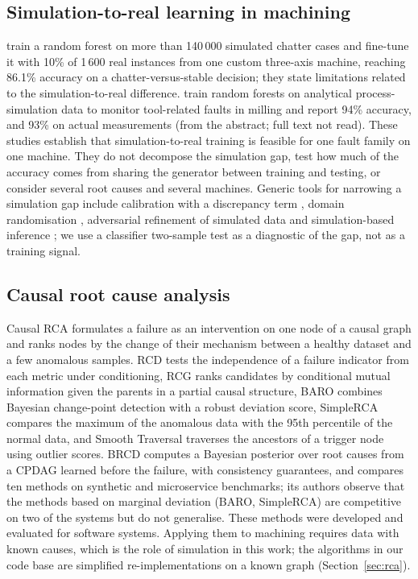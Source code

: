 \documentclass[11pt]{article}
\begin{document}
\subsection{Simulation-to-real learning in machining}
\citet{alberts2024sim2real} train a random forest on more than 140\,000 simulated chatter cases and fine-tune it with 10\% of 1\,600 real instances from one custom three-axis machine, reaching 86.1\% accuracy on a chatter-versus-stable decision; they state limitations related to the simulation-to-real difference.
\citet{ebrahimi2023smartfaults} train random forests on analytical process-simulation data to monitor tool-related faults in milling and report 94\% accuracy, and 93\% on actual measurements (from the abstract; full text not read).
These studies establish that simulation-to-real training is feasible for one fault family on one machine.
They do not decompose the simulation gap, test how much of the accuracy comes from sharing the generator between training and testing, or consider several root causes and several machines.
Generic tools for narrowing a simulation gap include calibration with a discrepancy term \citep{kennedy2001}, domain randomisation \citep{tobin2017}, adversarial refinement of simulated data \citep{shrivastava2017} and simulation-based inference \citep{cranmer2020}; we use a classifier two-sample test \citep{lopezpaz2017c2st} as a diagnostic of the gap, not as a training signal.

\subsection{Causal root cause analysis}
Causal RCA formulates a failure as an intervention on one node of a causal graph and ranks nodes by the change of their mechanism between a healthy dataset and a few anomalous samples.
RCD \citep{ikram2022rcd} tests the independence of a failure indicator from each metric under conditioning, RCG \citep{ikram2025rcg} ranks candidates by conditional mutual information given the parents in a partial causal structure, BARO \citep{pham2024baro} combines Bayesian change-point detection with a robust deviation score, SimpleRCA \citep{fang2025simplerca} compares the maximum of the anomalous data with the 95th percentile of the normal data, and Smooth Traversal \citep{orchard2025} traverses the ancestors of a trigger node using outlier scores.
BRCD \citep{lee2026brcd} computes a Bayesian posterior over root causes from a CPDAG learned before the failure, with consistency guarantees, and compares ten methods on synthetic and microservice benchmarks; its authors observe that the methods based on marginal deviation (BARO, SimpleRCA) are competitive on two of the systems but do not generalise.
These methods were developed and evaluated for software systems.
Applying them to machining requires data with known causes, which is the role of simulation in this work; the algorithms in our code base are simplified re-implementations on a known graph (Section~\ref{sec:rca}).
\end{document}
